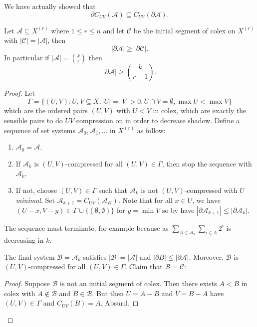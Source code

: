 \documentclass[a4paper]{article}
\newcommand{\shadow}{\partial}
\begin{document}
\begin{remark}
  We have actually showed that
  \[
    \shadow C_{UV}(\mathcal A) \subseteq C_{UV}(\shadow \mathcal A).
  \]
\end{remark}

\begin{theorem}
  \label{thm:Kruskal-Katona}
  Let \(\mathcal A \subseteq X^{(r)}\) where \(1 \leq r \leq n\) and let \(\mathcal C\) be the initial segment of colex on \(X^{(r)}\) with \(|\mathcal C| = |\mathcal A|\), then
  \[
    |\shadow \mathcal A| \geq |\shadow \mathcal C|.
  \]
  In particular if \(|\mathcal A| = \binom{k}{r}\) then
  \[
    |\shadow \mathcal A| \geq \binom{k}{r - 1}.
  \]
\end{theorem}

\begin{proof}
  Let
  \[
    \Gamma = \{(U, V): U, V \subseteq X, |U| = |V| > 0, U \cap V = \emptyset, \max U < \max V\}
  \]
  which are the ordered pairs \((U, V)\) with \(U < V\) in colex, which are exactly the sensible pairs to do \(UV\) compression on in order to decrease shadow. Define a sequence of set systems \(\mathcal A_0, \mathcal A_1, \dots\) in \(X^{(r)}\) as follow:
  \begin{enumerate}
  \item \(\mathcal A_0 = \mathcal A\).
  \item If \(\mathcal A_k\) is \((U, V)\)-compressed for all \((U, V) \in \Gamma\), then stop the sequence with \(\mathcal A_k\).
  \item If not, choose \((U, V) \in \Gamma\) such that \(\mathcal A_k\) is not \((U, V)\)-compressed with \(U\) \emph{minimal}. Set \(\mathcal A_{k + 1} = C_{UV}(\mathcal A_K)\). Note that for all \(x \in U\), we have \((U - x, V - y) \in \Gamma \cup \{(\emptyset, \emptyset)\}\) for \(y = \min V\) so by  have \(|\shadow \mathcal A_{k + 1}| \leq |\shadow \mathcal A_k|\).
  \end{enumerate}

  The sequence must terminate, for example because as \(\sum_{A \in \mathcal A_k}\sum_{i \in A} 2^i\) is decreasing in \(k\).

  The final system \(\mathcal B = \mathcal A_k\) satisfies \(|\mathcal B| = |\mathcal A|\) and \(|\shadow B| \leq |\shadow \mathcal A|\). Moreover, \(\mathcal B\) is \((U, V)\)-compressed for all \((U, V) \in \Gamma\). Claim that \(\mathcal B = \mathcal C\):
  \begin{proof}
    Suppose \(\mathcal B\) is not an initial segment of colex. Then there exists \(A < B\) in colex with \(A \notin \mathcal B\) and \(B \in \mathcal B\). But then \(U = A - B\) and \(V = B - A\) have \((U, V) \in \Gamma\) and \(C_{UV}(B) = A\). Absurd.
  \end{proof}
\end{proof}
\end{document}
